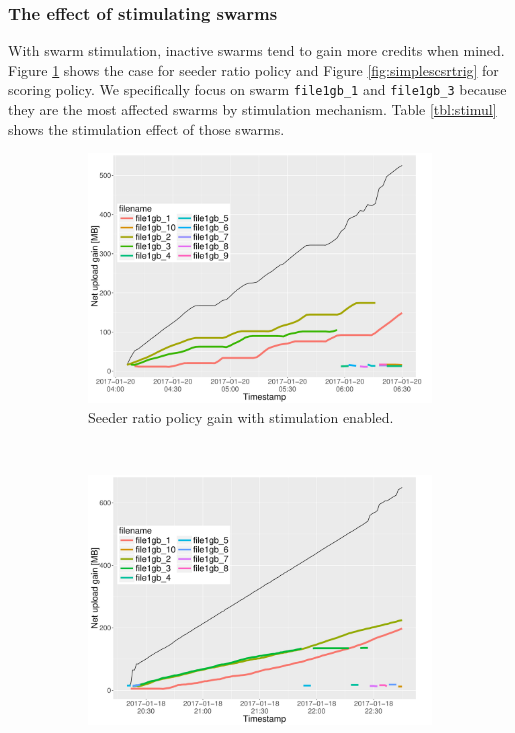 \subsubsection{The effect of stimulating swarms}
With swarm stimulation, inactive swarms tend to gain more credits when mined. Figure \ref{fig:simplesrtrig} shows the case for seeder ratio policy and Figure \ref{fig:simplescsrtrig} for scoring policy. We specifically focus on swarm \texttt{file1gb\_1} and \texttt{file1gb\_3} because they are the most affected swarms by stimulation mechanism. Table \ref{tbl:stimul} shows the stimulation effect of those swarms.

\begin{figure}[h]
	\begin{adjustwidth}{-1.5cm}{}
		\begin{subfigure}[t]{0.6\textwidth}
			\centering
			\includegraphics[width=\textwidth]{pics/results/simple3_sr_trig.pdf}
			\caption{Seeder ratio policy gain with stimulation enabled.}
			\label{fig:simplesrtrig}
		\end{subfigure}
		~
		\begin{subfigure}[t]{0.6\textwidth}
			\centering
			\includegraphics[width=\textwidth]{pics/results/simple1_scsr_trig.pdf}

\end{subfigure}
\end{adjustwidth}
\end{figure}
